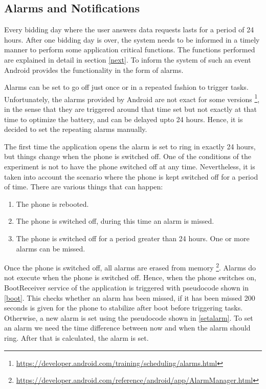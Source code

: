 \subsection{Alarms and Notifications}

Every bidding day where the user answers data requests lasts for a period of 24 hours. After one bidding day is over, the system needs to be informed in a timely manner to perform some application critical functions. The functions performed are explained in detail in section \ref{next}. 
To inform the system of such an event Android provides the functionality in the form of alarms. 

Alarms can be set to go off just once or in a repeated fashion to trigger tasks. Unfortunately, the alarms provided by Android are not exact for some versions \footnote{\url{https://developer.android.com/training/scheduling/alarms.html}}, in the sense that they are triggered around that time set but not exactly at that time to optimize the battery, and can be delayed upto 24 hours. Hence, it is decided to set the repeating alarms manually. 

The first time the application opens the alarm is set to ring in exactly 24 hours, but things change when the phone is switched off.
One of the conditions of the experiment is not to have the phone switched off at any time. Nevertheless, it is taken into account the scenario where
the phone is kept switched off for a period of time. There are various things that can happen:

\begin{enumerate}
	\item The phone is rebooted.
	\item The phone is switched off, during this time an alarm is missed.
    \item The phone is switched off for a period greater than 24 hours. One or more alarms can be missed.
\end{enumerate}

Once the phone is switched off, all alarms are erased from memory \footnote{\url{https://developer.android.com/reference/android/app/AlarmManager.html}}. Alarms do not execute when the phone is switched off. Hence, when the phone switches on,
BootReceiver service of the application is triggered with pseudocode shown in \ref{boot}. This checks whether an alarm has been missed, if it has been missed 200 seconds is given for the phone to stabilize after boot before triggering tasks. Otherwise, a new alarm is set using the pseudocode shown in \ref{setalarm}. To set an alarm we need the time difference between now and when the alarm should ring. After that is calculated, the alarm is set.

